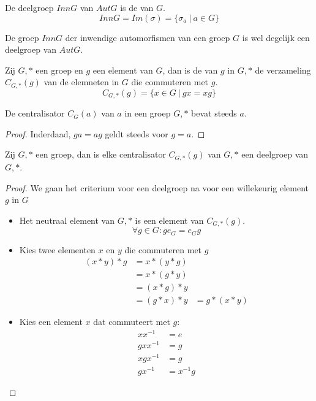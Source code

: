 \documentclass[main.tex]{subfiles}
\begin{document}
\begin{de}
  De deelgroep $InnG$ van $AutG$ is de  van $G$.
  \[ InnG = Im(\sigma) = \{ \sigma_{a}\ |\ a \in G \} \]
\end{de}

\begin{st}
  De groep $InnG$ der inwendige automorfismen van een groep $G$ is wel degelijk een deelgroep van $AutG$.
\end{st}


\begin{de}
  Zij $G,*$ een groep en $g$ een element van $G$, dan is de  van $g$ in $G,*$ de verzameling $C_{G,*}(g)$ van de elemneten in $G$ die commuteren met $g$.
  \[ C_{G,*}(g) = \{ x \in G\ |\ gx = xg \} \]
\end{de}

\begin{ei}
  \label{ei:centralisator-bevat-element}
  De centralisator $C_{G}(a)$ van $a$ in een groep $G,*$ bevat steeds $a$.
  
  \begin{proof}
    Inderdaad, $ga = ag$ geldt steeds voor $g=a$.
  \end{proof}
\end{ei}

\begin{ei}
  \label{ei:centralisator-is-deelgroep}
  Zij $G,*$ een groep, dan is elke centralisator $C_{G,*}(g)$ van $G,*$ een deelgroep van $G,*$.
  \begin{proof}
    We gaan het criterium voor een deelgroep na voor een willekeurig element $g$ in $G$
    \begin{itemize}
    \item Het neutraal element van $G,*$ is een element van $C_{G,*}(g)$.
      \[ \forall g\in G: ge_{G} = e_{G}g \]
    \item Kies twee elementen $x$ en $y$ die commuteren met $g$
      \[
      \begin{array}{rll}
        (x*y)*g &= x*(y*g)&\\
                &= x*(g*y) &\\
                &= (x*g)*y &\\
                &= (g*x)*y &= g*(x*y)
      \end{array}
      \]
    \item Kies een element $x$ dat commuteert met $g$:
      \[
      \begin{array}{rl}
        xx^{-1} &= e\\
        gxx^{-1} &= g\\
        xgx^{-1} &= g\\
        gx^{-1} &= x^{-1}g
      \end{array}
      \]
    \end{itemize}
  \end{proof}
\end{ei}
\end{document}
